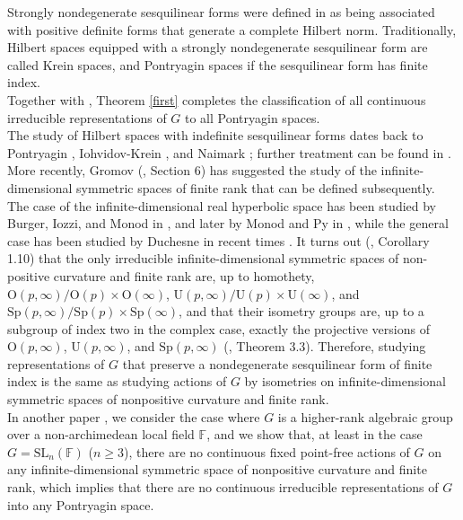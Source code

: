 \documentclass{article}
\theoremstyle{definition}
\theoremstyle{remark}
\theoremstyle{plain}
\begin{document}
Strongly nondegenerate sesquilinear forms were defined in \cite{bim} as being associated with positive definite forms that generate a complete Hilbert norm. Traditionally, Hilbert spaces equipped with a strongly nondegenerate sesquilinear form are called Krein spaces, and Pontryagin spaces if the sesquilinear form has finite index. \\

Together with \cite{olsh,talanebbia,bim}, Theorem \ref{first} completes the classification of all continuous irreducible representations of $G$ to all Pontryagin spaces. \\

The study of Hilbert spaces with indefinite sesquilinear forms dates back to Pontryagin \cite{pontryagin}, Iohvidov-Krein \cite{iohkrein}, and Naimark \cite{naimark1,naimark2,naimark3,naimark4}; further treatment can be found in \cite{aziioh,bognar,iohkrlan}. More recently, Gromov (\cite{gromov}, Section 6) has suggested the study of the infinite-dimensional symmetric spaces of finite rank that can be defined subsequently. The case of the infinite-dimensional real hyperbolic space has been studied by Burger, Iozzi, and Monod in \cite{bim}, and later by Monod and Py in \cite{monodpy}, while the general case has been studied by Duchesne in recent times \cite{ducphd,duc2013,duc2015,duc2023}. It turns out (\cite{duc2015}, Corollary 1.10) that the only irreducible infinite-dimensional symmetric spaces of non-positive curvature and finite rank are, up to homothety, $\mathrm{O}(p,\infty)/\mathrm{O}(p)\times\mathrm{O}(\infty)$, $\mathrm{U}(p,\infty)/\mathrm{U}(p)\times\mathrm{U}(\infty)$, and $\mathrm{Sp}(p,\infty)/\mathrm{Sp}(p)\times\mathrm{Sp}(\infty)$, and that their isometry groups are, up to a subgroup of index two in the complex case, exactly the projective versions of $\mathrm{O}(p,\infty)$, $\mathrm{U}(p,\infty)$, and $\mathrm{Sp}(p,\infty)$ (\cite{duc2023}, Theorem 3.3). Therefore, studying representations of $G$ that preserve a nondegenerate sesquilinear form of finite index is the same as studying actions of $G$ by isometries on infinite-dimensional symmetric spaces of nonpositive curvature and finite rank. \\

In another paper \cite{sln}, we consider the case where $G$ is a higher-rank algebraic group over a non-archimedean local field $\mathbb{F}$, and we show that, at least in the case $G=\mathrm{SL}_n(\mathbb{F})$ ($n\geq 3$), there are no continuous fixed point-free actions of $G$ on any infinite-dimensional symmetric space of nonpositive curvature and finite rank, which implies that there are no continuous irreducible representations of $G$ into any Pontryagin space. \\
\end{document}
